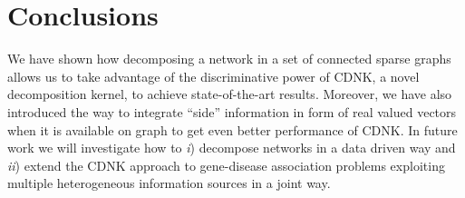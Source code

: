 \documentclass[review]{elsarticle}
\begin{document}
\section{Conclusions}
We have shown how decomposing a network in a set of connected sparse graphs allows us to take advantage of the discriminative power of CDNK, a novel decomposition kernel, to achieve state-of-the-art results. Moreover, we have also introduced the way to integrate ``side'' information in form of real valued vectors when it is available on graph to get even better performance of CDNK. In future work we will investigate how to \textit{i}) decompose networks in a data driven way and \textit{ii}) extend the CDNK approach to gene-disease association problems exploiting multiple heterogeneous information sources in a joint way.
%
%
%
\end{document}
